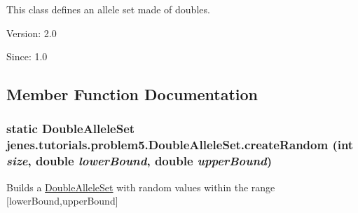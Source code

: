 This class defines an allele set made of doubles.

\begin{Desc}
\item[Version:]2.0 \end{Desc}
\begin{Desc}
\item[Since:]1.0 \end{Desc}


\subsection{Member Function Documentation}
\hypertarget{classjenes_1_1tutorials_1_1problem5_1_1_double_allele_set_c831f648cab055cd70e3f1b47225529e}{
\subsubsection[createRandom]{\setlength{\rightskip}{0pt plus 5cm}static {\bf DoubleAlleleSet} jenes.tutorials.problem5.DoubleAlleleSet.createRandom (int {\em size}, \/  double {\em lowerBound}, \/  double {\em upperBound})}}
\label{classjenes_1_1tutorials_1_1problem5_1_1_double_allele_set_c831f648cab055cd70e3f1b47225529e}


Builds a \hyperlink{classjenes_1_1tutorials_1_1problem5_1_1_double_allele_set}{DoubleAlleleSet} with random values within the range \mbox{[}lowerBound,upperBound\mbox{]} 

